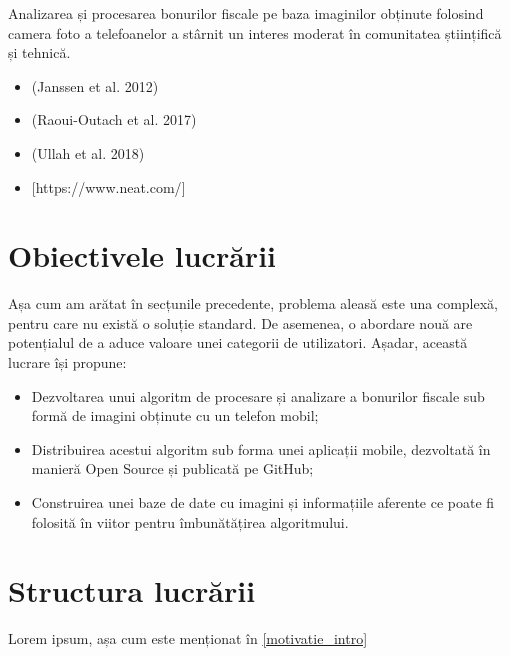 Analizarea și procesarea bonurilor fiscale pe baza imaginilor obținute folosind camera foto a telefoanelor a stârnit un interes moderat în comunitatea științifică și tehnică.

\begin{itemize}
    \item
        (Janssen et al. 2012) \cite{Receipts2Go}
    \item
        (Raoui-Outach et al. 2017) \cite{DL_receipt_understanding}
    \item
        (Ullah et al. 2018) \cite{Heuristics_extract}
    \item
        {[}https://www.neat.com/{]}
\end{itemize}

\section{Obiectivele lucrării}\label{obiective_intro}

Așa cum am arătat în secțunile precedente, problema aleasă este una complexă, pentru care nu există o soluție standard. De asemenea, o abordare nouă are potențialul de a aduce valoare unei categorii de utilizatori. Așadar, această lucrare își propune:

\begin{itemize}
    \item 
    Dezvoltarea unui algoritm de procesare și analizare a bonurilor fiscale sub formă de imagini obținute cu un telefon mobil;
    \item
    Distribuirea acestui algoritm sub forma unei aplicații mobile, dezvoltată în manieră Open Source și publicată pe GitHub;
    \item
    Construirea unei baze de date cu imagini și informațiile aferente ce poate fi folosită în viitor pentru îmbunătățirea algoritmului.
\end{itemize}

\section{Structura lucrării}\label{structura_intro}

Lorem ipsum, așa cum este menționat în \ref{motivatie_intro}
